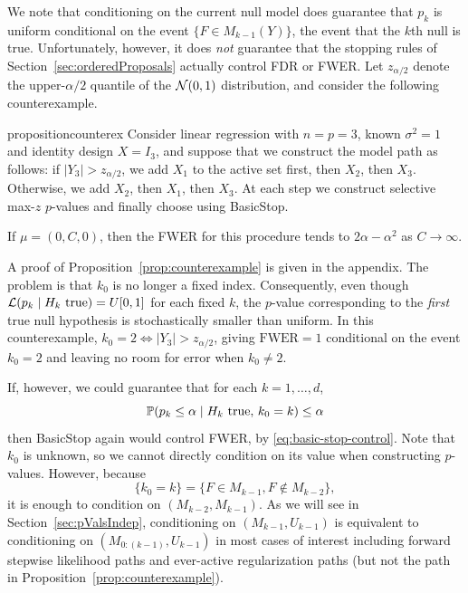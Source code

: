 \documentclass{article}
\begin{document}
We note that conditioning on the current null model does guarantee that $p_k$ is uniform conditional on the event $\{F\in M_{k-1}(Y)\}$, the event that the $k$th null is true. Unfortunately, however, it does {\em not} guarantee that the stopping rules of Section~\ref{sec:orderedProposals} actually control FDR or FWER. Let $z_{\alpha/2}$ denote the upper-$\alpha/2$ quantile of the $\cN(0,1)$ distribution, and consider the following counterexample.

\begin{restatable}{proposition}{counterex}\label{prop:counterexample}
Consider linear regression with $n=p=3$, known $\sigma^2=1$ and identity design $X=I_3$, and suppose that we construct the model path as follows: if $|Y_3|>z_{\alpha/2}$, we add $X_1$ to the active set first, then $X_2$, then $X_3$. Otherwise, we add $X_2$, then $X_1$, then $X_3$. At each step we construct selective max-$z$ $p$-values and finally choose \smash{$\hk$} using BasicStop. 

If $\mu=(0,C,0)$, then the FWER for this procedure tends to $2\alpha-\alpha^2$ as $C\to\infty$.
\end{restatable}

A proof of Proposition~\ref{prop:counterexample} is given in the appendix.  The problem is that $k_0$ is no longer a fixed index. Consequently, even though $\cL(p_k \mid H_k \text{ true})=U[0,1]$ for each fixed $k$, the $p$-value  corresponding to the {\em first} true null hypothesis is stochastically smaller than uniform. In this counterexample, $k_0=2 \iff |Y_3|>z_{\alpha/2}$, giving $\text{FWER}= 1$ conditional on the event $k_0=2$ and leaving no room for error when $k_0\neq 2$.

If, however, we could guarantee that for each $k=1,\ldots, d$,
\[
\P(p_k \leq \alpha \mid H_k \text{ true},\, k_0=k) \leq \alpha
\]
then BasicStop again would control FWER, by \eqref{eq:basic-stop-control}. Note that $k_0$ is unknown, so we cannot directly condition on its value when constructing $p$-values. However, because
\[
\{k_0=k\} = \{F\in M_{k-1}, F\notin M_{k-2}\},
\]
it is enough to condition on $(M_{k-2}, M_{k-1})$. As we will see in Section~\ref{sec:pValsIndep}, conditioning on $(M_{k-1}, U_{k-1})$ is equivalent to conditioning on $(M_{0:(k-1)}, U_{k-1})$ in most cases of interest including forward stepwise likelihood paths and ever-active regularization paths (but not the path in Proposition~\ref{prop:counterexample}).
\end{document}
